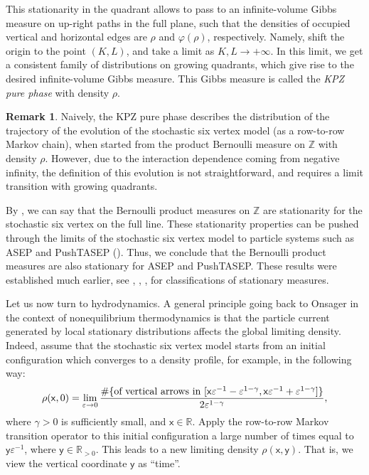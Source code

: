 \documentclass[letterpaper,11pt,oneside,reqno]{article}
\numberwithin{equation}{section}
\theoremstyle{definition}
\newtheorem{remark}[proposition]{Remark}
\theoremstyle{remark}
\begin{document}
This stationarity in the quadrant allows to pass to an infinite-volume
Gibbs measure on up-right paths 
in the full plane, such that the densities of occupied vertical and horizontal
edges are $\rho$ and $\varphi(\rho)$, respectively.
Namely, shift the origin to the point $(K,L)$, and take a limit as $K,L\to+\infty$.
In this limit, we get a consistent family of distributions on growing quadrants, 
which give rise to the desired infinite-volume 
Gibbs measure. 
This Gibbs measure is called the \emph{KPZ pure phase} with density $\rho$.

\begin{remark}
	\label{rmk:KPZ_phase}
	Naively, the KPZ pure phase describes the distribution of the 
	trajectory of the evolution of the stochastic six vertex 
	model (as a row-to-row Markov chain), when started from the 
	product Bernoulli measure on $\mathbb{Z}$ with density $\rho$.
	However, due to the interaction dependence coming from 
	negative infinity, the definition of this evolution 
	is not straightforward, and requires a limit transition 
	with growing quadrants.
\end{remark}

By , we can say that the Bernoulli product measures on $\mathbb{Z}$
are stationarity for the stochastic six vertex
on the full line. These stationarity properties can be pushed through the 
limits of the stochastic six vertex model to particle systems such as ASEP and PushTASEP
().
Thus, we conclude that the Bernoulli product
measures are also stationary for ASEP and PushTASEP.
These results were established much earlier, 
see 
\cite{liggett1976coupling},
\cite{Liggett1985}, \cite{guiol1997resultat},
\cite{andjel2005long}
for classifications of stationary measures.

\medskip

Let us now turn to hydrodynamics.
A general principle going back to Onsager \cite{onsager1931reciprocal}
in the context of nonequilibrium thermodynamics
is that the particle
current generated by local 
stationary distributions 
affects the global limiting density. 
Indeed, assume that the stochastic six vertex model starts from an
initial configuration which converges to a density profile, for example, in the following way:
\begin{equation*}
	\rho(\mathsf{x},0)=\lim_{\varepsilon\to0}\frac{\#\{\textnormal{of vertical arrows in 
	$[\mathsf{x}\varepsilon^{-1}-\varepsilon^{1-\gamma},\mathsf{x}\varepsilon^{-1}+\varepsilon^{1-\gamma}]$}\}}{2\varepsilon^{1-\gamma}},
\end{equation*}
where $\gamma>0$ is sufficiently small, and $\mathsf{x}\in \mathbb{R}$. 
Apply the row-to-row Markov transition operator to this initial configuration
a large number of times equal to $\mathsf{y}\varepsilon^{-1}$, where $\mathsf{y}\in \mathbb{R}_{>0}$.
This leads to a new limiting density $\rho(\mathsf{x},\mathsf{y})$.
That is, we view the vertical coordinate $\mathsf{y}$
as ``time''.
\end{document}
